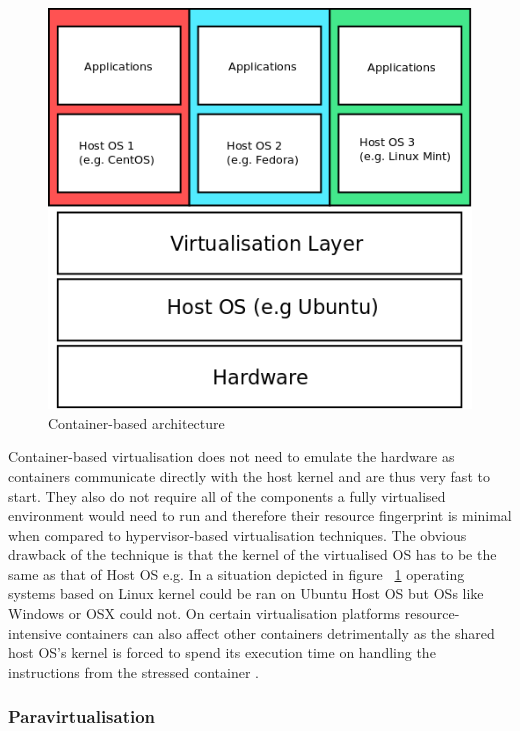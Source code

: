 \begin{figure}[ht!]
\centering
  \includegraphics[width=\textwidth, keepaspectratio]{containers.png}%
  \caption{Container-based architecture}
  \label{fig:container}
\end{figure}

Container-based virtualisation does not need to emulate the hardware as containers communicate directly with the host kernel \cite{eder2016hypervisor} and are thus very fast to start. They also do not require all of the components a fully virtualised environment would need to run and therefore their resource fingerprint is minimal when compared to hypervisor-based virtualisation techniques. \linebreak
The obvious drawback of the technique is that the kernel of the virtualised OS has to be the same as that of Host OS e.g. In a situation depicted in figure ~\ref{fig:container} operating systems based on  Linux kernel could be ran on Ubuntu Host OS but OSs like Windows or OSX could not. On certain virtualisation platforms resource-intensive containers can also affect other containers detrimentally as the shared host OS's kernel is forced to spend its execution time on handling the instructions from the stressed container \cite{Xaviercontainer}.


\subsubsection{Paravirtualisation}

